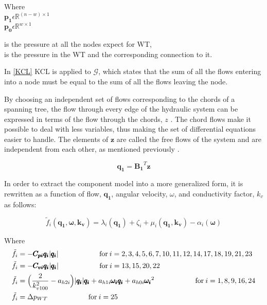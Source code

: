 \begin{minipage}[t]{0.20\textwidth}
Where\\
\hspace*{8mm} $\pmb{p_1} \epsilon \mathbb{R}^{(n-w) \times 1}$  \\
\hspace*{8mm} $\pmb{p_0} \epsilon \mathbb{R}^{w \times 1} $ 
\end{minipage}
\begin{minipage}[t]{0.68\textwidth}
\vspace*{2mm}
\hspace*{4mm} is the pressure at all the nodes expect for WT,\\
\hspace*{4mm} is the pressure in the WT and the corresponding connection to it.
\end{minipage}

In \eqref{KCL} KCL is applied to $\mathcal{G}$, which states that the sum of all the flows entering into a node must be equal to the sum of all the flows leaving the node.

By choosing an independent set of flows corresponding to the chords of a spanning tree, the flow through every edge of the hydraulic system can be expressed in terms of the flow through the chords, $z$ \cite{GraphModel}.
The chord flows make it possible to deal with less variables, thus making the set of differential equations easier to handle.  The elements of $\pmb{z}$ are called the free flows of the system and are independent from each other, as mentioned previously \cite{GraphTheoryCarsten}.

\begin{equation}
  \pmb{q_1} = \pmb{B_1} ^{T}  \pmb{z}
  \label{ChordRelation}
\end{equation}

In order to extract the component model into a more generalized form, it is rewritten as a function of flow, $\pmb{q_1}$, angular velocity, $\omega$, and conductivity factor, $k_v$ as follows:

\begin{equation}
  \tilde{f}_i(\pmb{q_1}, \pmb{\omega}, \pmb{k_v}) = \lambda_i(\pmb{q_1}) + \zeta_i + \mu_i(\pmb{q_1}, \pmb{k_v}) - \alpha_i(\pmb{\omega})
  \label{ComponentFunction}
\end{equation}

Where\\
\begin{align}
\tilde{f}_i &= -\pmb{C_{pi} q_i} |\pmb{q_i}|  \hskip 2cm  \text{for}\: i = 2,3,4,5,6,7,10,11,12,14,17,18,19,21,23 \\
\tilde{f}_i &= -\pmb{C_{vi} q_i} |\pmb{q_i}|  \hskip 2cm  \text{for}\:i = 13,15,20,22\\
\tilde{f}_i &= \Big(\frac{2}{k_{v100}^2} - a_{h2i}\Big)|\pmb{q_i}| \pmb{q_i}  + a_{h1i} \pmb{\omega_{i}} \pmb{q_i} + a_{h0i}\pmb{{\omega_i}}^2 \hskip 2cm  \text{for}\: i = 1,8,9,16,24 \\
\tilde{f}_i &= \Delta p_{WT}  \hskip 2cm  \text{for}\:i = 25
\end{align}

